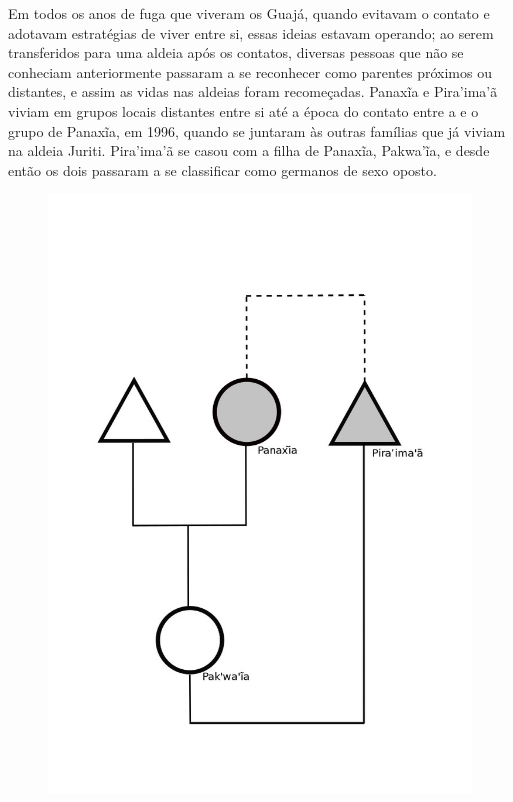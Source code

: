 Em todos os anos de fuga que viveram os Guajá, quando evitavam o contato
e adotavam estratégias de viver entre si, essas ideias estavam operando;
ao serem transferidos para uma aldeia após os contatos, diversas pessoas
que não se conheciam anteriormente passaram a se reconhecer como
parentes próximos ou distantes, e assim as vidas nas aldeias foram
recomeçadas. Panaxĩa e Pira'ima'ã viviam em grupos locais distantes
entre si até a época do contato entre a  e o grupo de Panaxĩa, em
1996, quando se juntaram às outras famílias que já viviam na aldeia
Juriti. Pira'ima'ã se casou com a filha de Panaxĩa, Pakwa'ĩa, e desde
então os dois passaram a se classificar como germanos de sexo oposto.

\begin{figure}[H]
\centering
  \includegraphics[width=\textwidth]{./imgs/Figura_5}
\end{figure}

